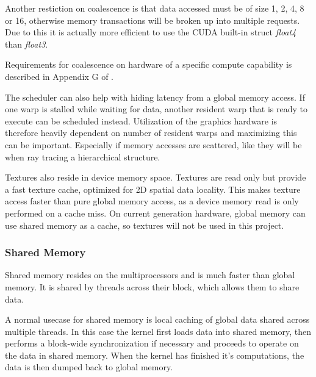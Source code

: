 
Another restiction on coalescence is that data accessed must be of
size 1, 2, 4, 8 or 16, otherwise memory transactions will be broken up
into multiple requests. Due to this it is actually more efficient to
use the CUDA built-in struct \textit{float4} than \textit{float3}.

Requirements for coalescence on hardware of a specific compute
capability is described in Appendix G of .


The scheduler can also help with hiding latency from a global memory
access. If one warp is stalled while waiting for data, another
resident warp that is ready to execute can be scheduled
instead. Utilization of the graphics hardware is therefore heavily
dependent on number of resident warps and maximizing this can be
important. Especially if memory accesses are scattered, like they will
be when ray tracing a hierarchical structure.


Textures also reside in device memory space. Textures are read only
but provide a fast texture cache, optimized for 2D spatial data
locality. This makes texture access faster than pure global memory
access, as a device memory read is only performed on a cache miss. On
current generation hardware, global memory can use shared memory as a
cache, so textures will not be used in this project.

\subsubsection{Shared Memory}


Shared memory resides on the multiprocessors and is much faster than
global memory. It is shared by threads across their block, which
allows them to share data.


A normal usecase for shared memory is local caching of global data
shared across multiple threads. In this case the kernel first loads
data into shared memory, then performs a block-wide synchronization if
necessary and proceeds to operate on the data in shared memory. When
the kernel has finished it's computations, the data is then dumped
back to global memory.

